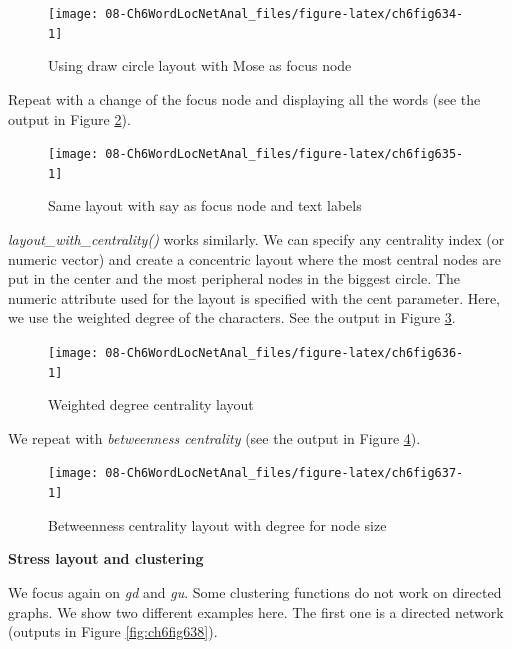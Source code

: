 \documentclass[
]{article}
\begin{document}
\begin{figure}

{\centering \texttt{[image: 08-Ch6WordLocNetAnal\_files/figure-latex/ch6fig634-1]} 

}

\caption{Using draw circle layout with Mose as focus node}\label{fig:ch6fig634}
\end{figure}

Repeat with a change of the focus node and displaying all the words (see the output in Figure \ref{fig:ch6fig635}).

\begin{figure}

{\centering \texttt{[image: 08-Ch6WordLocNetAnal\_files/figure-latex/ch6fig635-1]} 

}

\caption{Same layout with say as focus node and text labels}\label{fig:ch6fig635}
\end{figure}

\emph{layout\_with\_centrality()} works similarly. We can specify any centrality index (or numeric vector) and create a concentric layout where the most central nodes are put in the center and the most peripheral nodes in the biggest circle. The numeric attribute used for the layout is specified with the cent parameter. Here, we use the weighted degree of the characters. See the output in Figure \ref{fig:ch6fig636}.

\begin{figure}

{\centering \texttt{[image: 08-Ch6WordLocNetAnal\_files/figure-latex/ch6fig636-1]} 

}

\caption{Weighted degree centrality layout}\label{fig:ch6fig636}
\end{figure}

We repeat with \emph{betweenness centrality} (see the output in Figure \ref{fig:ch6fig637}).

\begin{figure}

{\centering \texttt{[image: 08-Ch6WordLocNetAnal\_files/figure-latex/ch6fig637-1]} 

}

\caption{Betweenness centrality layout with degree for node size}\label{fig:ch6fig637}
\end{figure}

\textbf{Stress layout and clustering}

We focus again on \emph{gd} and \emph{gu}. Some clustering functions do not work on directed graphs. We show two different examples here. The first one is a directed network (outputs in Figure \ref{fig:ch6fig638}).
\end{document}
